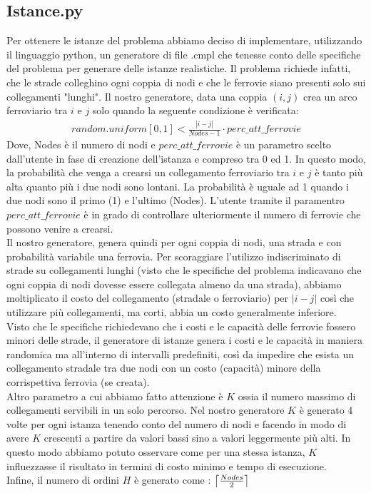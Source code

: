 \documentclass{article}
\DeclarePairedDelimiter\ceil{\lceil}{\rceil}
\begin{document}
\subsection{Istance.py}
Per ottenere le istanze del problema abbiamo deciso di implementare, utilizzando il linguaggio python, un generatore di file .cmpl che tenesse conto delle specifiche del problema per generare delle istanze realistiche. Il problema richiede infatti, che le strade colleghino ogni coppia di nodi e che le ferrovie siano presenti solo sui collegamenti "lunghi". Il nostro generatore, data una coppia $(i,j)$ crea un arco ferroviario tra $i$ e $j$ solo quando la seguente condizione è verificata:
\begin{align}
random.uniform[0,1] < \frac{|i -j|}{Nodes-1}\cdot perc\_att\_ferrovie
\end{align}
Dove, Nodes è il numero di nodi e $perc\_att\_ferrovie$ è un parametro scelto dall'utente in fase di creazione dell'istanza e compreso tra 0 ed 1. In questo modo, la probabilità che venga a crearsi un collegamento ferroviario tra $i$ e $j$ è tanto più alta quanto più i due nodi sono lontani. La probabilità è uguale ad 1 quando i due nodi sono il primo (1) e l'ultimo (Nodes). L'utente tramite il paramentro $perc\_att\_ferrovie$ è in grado di controllare ulteriormente il numero di ferrovie che possono venire a crearsi. 
\\
Il nostro generatore, genera quindi per ogni coppia di nodi, una strada e con probabilità variabile una ferrovia. Per scoraggiare l'utilizzo indiscriminato di strade su collegamenti lunghi (visto che le specifiche del problema indicavano che ogni coppia di nodi dovesse essere collegata almeno da una strada), abbiamo moltiplicato il costo del collegamento (stradale o ferroviario) per $|i-j|$ così che utilizzare più collegamenti, ma corti, abbia un costo generalmente inferiore.
\\
Visto che le specifiche richiedevano che i costi e le capacità delle ferrovie fossero minori delle strade, il generatore di istanze genera i costi e le capacità in maniera randomica ma all'interno di intervalli predefiniti, così da impedire che esista un collegamento stradale tra due nodi con un costo (capacità) minore della corrispettiva ferrovia (se creata).
\\
Altro parametro a cui abbiamo fatto attenzione è $K$ ossia il numero massimo di collegamenti servibili in un solo percorso. Nel nostro generatore $K$ è generato 4 volte per ogni istanza tenendo conto del numero di nodi e facendo in modo di avere $K$ crescenti a partire da valori bassi sino a valori leggermente più alti. In questo modo abbiamo potuto osservare come per una stessa istanza, $K$ influezzasse il risultato in termini di costo minimo e tempo di esecuzione.
\\
Infine, il numero di ordini $H$ è generato come : $\ceil*{\frac{Nodes}{2}}$
\end{document}
